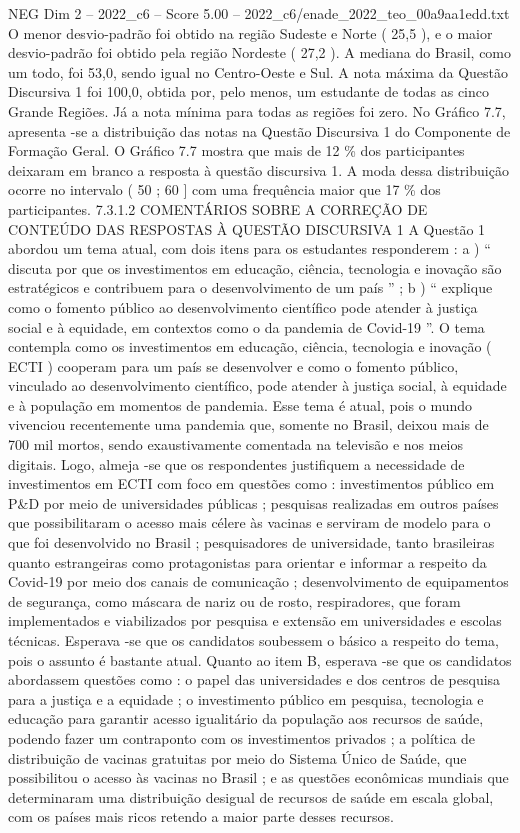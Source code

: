 \begin{textsample}{NEG Dim 2 – 2022\_c6 – Score 5.00 – 2022\_c6/enade\_2022\_teo\_00a9aa1edd.txt}
O menor desvio-padrão foi obtido na região Sudeste e Norte ( 25,5 ), e o maior desvio-padrão foi obtido pela região Nordeste ( 27,2 ).
A mediana do Brasil, como um todo, foi 53,0, sendo igual no Centro-Oeste e Sul.
A nota máxima da Questão Discursiva 1 foi 100,0, obtida por, pelo menos, um estudante de todas as cinco Grande Regiões.
Já a nota mínima para todas as regiões foi zero.
No Gráfico 7.7, apresenta -se a distribuição das notas na Questão Discursiva 1 do Componente de Formação Geral.
O Gráfico 7.7 mostra que mais de 12 \% dos participantes deixaram em branco a resposta à questão discursiva 1.
A moda dessa distribuição ocorre no intervalo ( 50 ; 60 ] com uma frequência maior que 17 \% dos participantes. 7.3.1.2 COMENTÁRIOS SOBRE A CORREÇÃO DE CONTEÚDO DAS RESPOSTAS À QUESTÃO DISCURSIVA 1 A Questão 1 abordou um tema atual, com dois itens para os estudantes responderem : a ) “ discuta por que os investimentos em educação, ciência, tecnologia e inovação são estratégicos e contribuem para o desenvolvimento de um país ” ; b ) “ explique como o fomento público ao desenvolvimento científico pode atender à justiça social e à equidade, em contextos como o da pandemia de Covid-19 ”.
O tema contempla como os investimentos em educação, ciência, tecnologia e inovação ( ECTI ) cooperam para um país se desenvolver e como o fomento público, vinculado ao desenvolvimento científico, pode atender à justiça social, à equidade e à população em momentos de pandemia.
Esse tema é atual, pois o mundo vivenciou recentemente uma pandemia que, somente no Brasil, deixou mais de 700 mil mortos, sendo exaustivamente comentada na televisão e nos meios digitais.
Logo, almeja -se que os respondentes justifiquem a necessidade de investimentos em ECTI com foco em questões como : investimentos público em P\&D por meio de universidades públicas ; pesquisas realizadas em outros países que possibilitaram o acesso mais célere às vacinas e serviram de modelo para o que foi desenvolvido no Brasil ; pesquisadores de universidade, tanto brasileiras quanto estrangeiras como protagonistas para orientar e informar a respeito da Covid-19 por meio dos canais de comunicação ; desenvolvimento de equipamentos de segurança, como máscara de nariz ou de rosto, respiradores, que foram implementados e viabilizados por pesquisa e extensão em universidades e escolas técnicas.
Esperava -se que os candidatos soubessem o básico a respeito do tema, pois o assunto é bastante atual.
Quanto ao item B, esperava -se que os candidatos abordassem questões como : o papel das universidades e dos centros de pesquisa para a justiça e a equidade ; o investimento público em pesquisa, tecnologia e educação para garantir acesso igualitário da população aos recursos de saúde, podendo fazer um contraponto com os investimentos privados ; a política de distribuição de vacinas gratuitas por meio do Sistema Único de Saúde, que possibilitou o acesso às vacinas no Brasil ; e as questões econômicas mundiais que determinaram uma distribuição desigual de recursos de saúde em escala global, com os países mais ricos retendo a maior parte desses recursos.

\end{textsample}
